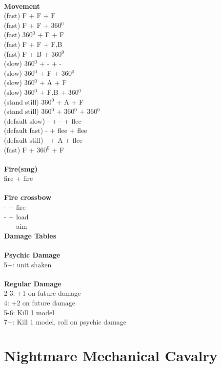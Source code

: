 \ \\ {\bf Movement } \\
(fast) F + F + F  \\
(fast) F + F + 360$^0$ \\
(fast) 360$^0$ + F + F \\
(fast) F + F + F,B \\
(fast) F + B + 360$^0$ \\
(slow) 360$^0$ + - + - \\
(slow) 360$^0$ + F + 360$^0$ \\
(slow) 360$^0$ + A + F \\
(slow) 360$^0$ + F,B + 360$^0$ \\
(stand still) 360$^0$ + A + F \\
(stand still) 360$^0$ + 360$^0$ + 360$^0$ \\
(default slow) - + - + flee \\
(default fast) - + flee + flee \\
(default still) - + A + flee \\
(fast) F + 360$^0$ + F \\
\ \\ {\bf Fire(smg) } \\
fire + fire \\
\ \\ {\bf Fire crossbow } \\
- + fire \\
- + load \\
- + aim \\



{\bf Damage Tables} \\
\ \\ {\bf Psychic Damage } \\
5+: unit shaken \\
\ \\ {\bf Regular Damage } \\
2-3: +1 on future damage \\
4: +2 on future damage \\
5-6: Kill 1 model \\
7+: Kill 1 model, roll on psychic damage \\









\pagebreak

\section{ Nightmare Mechanical Cavalry }

